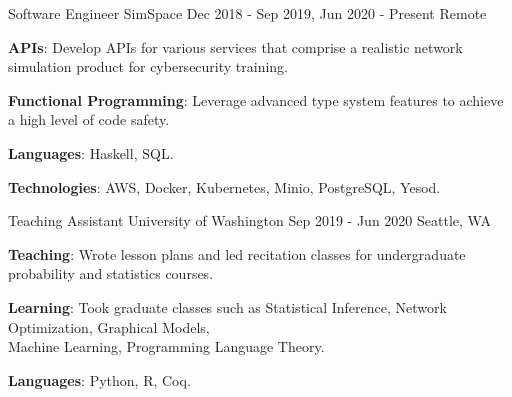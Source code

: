 

\begin{cventries}

  \longdatecventry
    {Software Engineer}
    {SimSpace}
    {Dec 2018 - Sep 2019, Jun 2020 - Present}
    {Remote}
    {
      \begin{cvitems}
        \item {\color{graytext}\textbf{APIs}}: Develop APIs for various services
          that comprise a realistic network simulation product for cybersecurity
          training.
        \item {\color{graytext}\textbf{Functional Programming}}: Leverage
          advanced type system features to achieve a high level of code safety.
        \item {\color{graytext}\textbf{Languages}}: Haskell, SQL.
        \item {\color{graytext}\textbf{Technologies}}: AWS, Docker, Kubernetes,
          Minio, PostgreSQL, Yesod.
      \end{cvitems}
    }

  \cventry
    {Teaching Assistant}
    {University of Washington}
    {Sep 2019 - Jun 2020}
    {Seattle, WA}
    {
      \begin{cvitems}
      \item {\color{graytext}\textbf{Teaching}}: Wrote lesson plans and led recitation classes
        for undergraduate probability and statistics courses.
      \item {\color{graytext}\textbf{Learning}}: Took graduate classes such as Statistical Inference, Network
        Optimization, Graphical Models,\\ Machine Learning, Programming Language
        Theory.
        \item {\color{graytext}\textbf{Languages}}: Python, R, Coq.
      \end{cvitems}
    }



\end{cventries}
